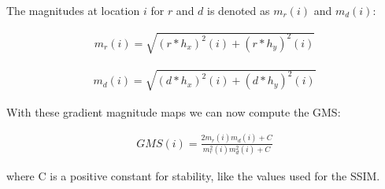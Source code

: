 The magnitudes at location $i$ for $r$ and $d$ is denoted as $m_r(i)$ and $m_d(i)$:

\begin{align}
    m_r(i) = \sqrt{ (r \ast h_x)^2 (i) + (r \ast h_y)^2 (i) }
\end{align}

\begin{align}
    m_d(i) = \sqrt{ (d \ast h_x)^2 (i) + (d \ast h_y)^2 (i) }
\end{align}

With these gradient magnitude maps we can now compute the GMS:

\begin{align}
    GMS(i) = \frac{2m_r (i) m_d (i) + C}{m^2_r(i) m^2_d(i) + C}
    \label{eq:prelim:gms}
\end{align}

where C is a positive constant for stability, like the values used for the SSIM.